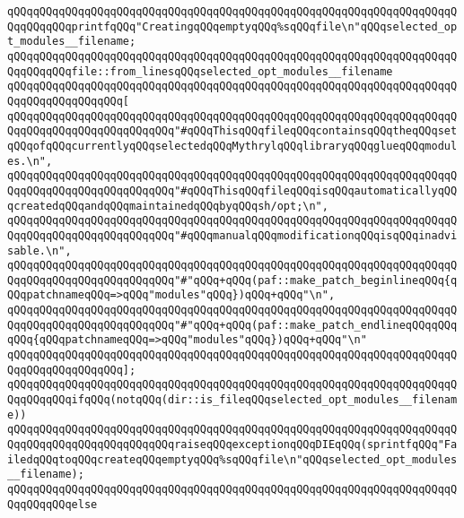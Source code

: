 \verb|qQQqqQQqqQQqqQQqqQQqqQQqqQQqqQQqqQQqqQQqqQQqqQQqqQQqqQQqqQQqqQQqqQQqqQQqqQQqqQQqprintfqQQq"CreatingqQQqemptyqQQq%sqQQqfile\n"qQQqselected_opt_modules__filename;|\newline
\newline
\verb|qQQqqQQqqQQqqQQqqQQqqQQqqQQqqQQqqQQqqQQqqQQqqQQqqQQqqQQqqQQqqQQqqQQqqQQqqQQqqQQqfile::from_linesqQQqselected_opt_modules__filename|\newline
\verb|qQQqqQQqqQQqqQQqqQQqqQQqqQQqqQQqqQQqqQQqqQQqqQQqqQQqqQQqqQQqqQQqqQQqqQQqqQQqqQQqqQQqqQQq[|\newline
\verb|qQQqqQQqqQQqqQQqqQQqqQQqqQQqqQQqqQQqqQQqqQQqqQQqqQQqqQQqqQQqqQQqqQQqqQQqqQQqqQQqqQQqqQQqqQQqqQQq"#qQQqThisqQQqfileqQQqcontainsqQQqtheqQQqsetqQQqofqQQqcurrentlyqQQqselectedqQQqMythrylqQQqlibraryqQQqglueqQQqmodules.\n",|\newline
\verb|qQQqqQQqqQQqqQQqqQQqqQQqqQQqqQQqqQQqqQQqqQQqqQQqqQQqqQQqqQQqqQQqqQQqqQQqqQQqqQQqqQQqqQQqqQQqqQQq"#qQQqThisqQQqfileqQQqisqQQqautomaticallyqQQqcreatedqQQqandqQQqmaintainedqQQqbyqQQqsh/opt;\n",|\newline
\verb|qQQqqQQqqQQqqQQqqQQqqQQqqQQqqQQqqQQqqQQqqQQqqQQqqQQqqQQqqQQqqQQqqQQqqQQqqQQqqQQqqQQqqQQqqQQqqQQq"#qQQqmanualqQQqmodificationqQQqisqQQqinadvisable.\n",|\newline
\verb|qQQqqQQqqQQqqQQqqQQqqQQqqQQqqQQqqQQqqQQqqQQqqQQqqQQqqQQqqQQqqQQqqQQqqQQqqQQqqQQqqQQqqQQqqQQqqQQq"#"qQQq+qQQq(paf::make_patch_beginlineqQQq{qQQqpatchnameqQQq=>qQQq"modules"qQQq})qQQq+qQQq"\n",|\newline
\verb|qQQqqQQqqQQqqQQqqQQqqQQqqQQqqQQqqQQqqQQqqQQqqQQqqQQqqQQqqQQqqQQqqQQqqQQqqQQqqQQqqQQqqQQqqQQqqQQq"#"qQQq+qQQq(paf::make_patch_endlineqQQqqQQqqQQq{qQQqpatchnameqQQq=>qQQq"modules"qQQq})qQQq+qQQq"\n"|\newline
\verb|qQQqqQQqqQQqqQQqqQQqqQQqqQQqqQQqqQQqqQQqqQQqqQQqqQQqqQQqqQQqqQQqqQQqqQQqqQQqqQQqqQQqqQQq];|\newline
\newline
\verb|qQQqqQQqqQQqqQQqqQQqqQQqqQQqqQQqqQQqqQQqqQQqqQQqqQQqqQQqqQQqqQQqqQQqqQQqqQQqqQQqifqQQq(notqQQq(dir::is_fileqQQqselected_opt_modules__filename))|\newline
\verb|qQQqqQQqqQQqqQQqqQQqqQQqqQQqqQQqqQQqqQQqqQQqqQQqqQQqqQQqqQQqqQQqqQQqqQQqqQQqqQQqqQQqqQQqqQQqqQQqraiseqQQqexceptionqQQqDIEqQQq(sprintfqQQq"FailedqQQqtoqQQqcreateqQQqemptyqQQq%sqQQqfile\n"qQQqselected_opt_modules__filename);|\newline
\verb|qQQqqQQqqQQqqQQqqQQqqQQqqQQqqQQqqQQqqQQqqQQqqQQqqQQqqQQqqQQqqQQqqQQqqQQqqQQqqQQqelse|\newline
